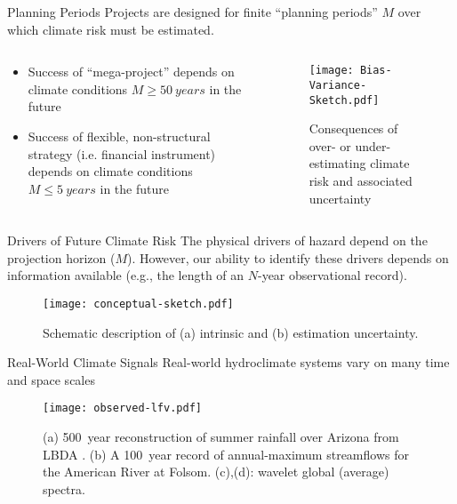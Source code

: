 \documentclass[
  10pt,     %
]{beamer}
\makeatletter
\newcommand*{\eg}{e.g.\@\xspace}
\newcommand*{\ie}{i.e.\@\xspace}
\makeatother
\begin{document}
\begin{frame}{Planning Periods}
  Projects are designed for finite ``planning periods'' $M$ over which climate risk must be estimated.
  \begin{columns}
    \begin{column}{0.6\textwidth}
      \begin{itemize}
        \item Success of ``mega-project'' depends on climate conditions $M \geq \SI{50}{years}$ in the future
        \item Success of flexible, non-structural strategy (\ie financial instrument) depends on climate conditions $M \leq \SI{5}{years}$ in the future
      \end{itemize}
    \end{column}
    \begin{column}{0.4\textwidth}
      \begin{figure}
        \texttt{[image: Bias-Variance-Sketch.pdf]}
        \caption{Consequences of over- or under-estimating climate risk and associated uncertainty}
      \end{figure}
    \end{column}
  \end{columns}
\end{frame}


\begin{frame}{Drivers of Future Climate Risk}
  The physical drivers of hazard depend on the projection horizon ($M$).
  However, our ability to identify these drivers depends on information available (\eg, the length of an $N$-year observational record).
  \begin{figure}
    \centering
    \texttt{[image: conceptual-sketch.pdf]}
    \caption{Schematic description of (a) intrinsic and (b) estimation uncertainty.}
  \end{figure}
\end{frame}

\begin{frame}{Real-World Climate Signals}
  Real-world hydroclimate systems vary on many time and space scales
  \begin{figure}
    \centering
    \texttt{[image: observed-lfv.pdf]}
    \caption{
      (a) \SI{500}{year} reconstruction of summer rainfall over Arizona from LBDA \citep{Cook:2010bz}.
      (b) A \SI{100}{year} record of annual-maximum streamflows for the American River at Folsom.
      (c),(d): wavelet global (average) spectra.
    }\label{fig:observed-lfv}
  \end{figure}
\end{frame}
\end{document}
